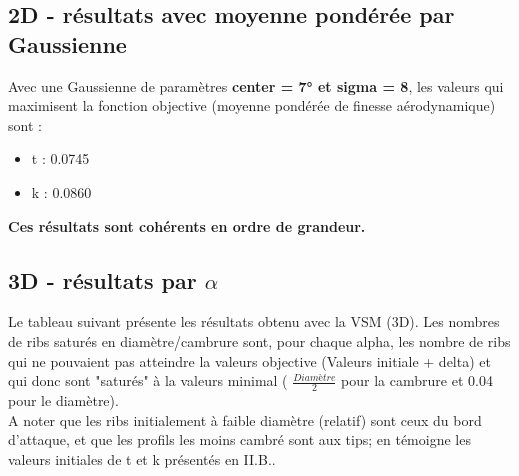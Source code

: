 \documentclass[conference]{IEEEtran}
\begin{document}
\subsection{2D - résultats avec moyenne pondérée par Gaussienne}

    Avec une Gaussienne de paramètres \textbf{center = 7° et sigma = 8}, les valeurs qui maximisent la fonction objective (moyenne pondérée de finesse aérodynamique) sont :
    \begin{itemize}
        \item t : 0.0745
        \item k : 0.0860
    \end{itemize}
    \textbf{Ces résultats sont cohérents en ordre de grandeur.}

\subsection{3D - résultats par $\alpha$}

Le tableau suivant présente les résultats obtenu avec la VSM (3D). Les nombres de ribs saturés en diamètre/cambrure sont, pour chaque alpha, les nombre de ribs qui ne pouvaient pas atteindre la valeurs objective (Valeurs initiale + delta) et qui donc sont "saturés" à la valeurs minimal ( $\frac{Diamètre}{2}$ pour la cambrure et 0.04 pour le diamètre).\\

A noter que les ribs initialement à faible diamètre (relatif) sont ceux du bord d'attaque, et que les profils les moins cambré sont aux tips; en témoigne les valeurs initiales de t et k présentés en II.B..
\end{document}
